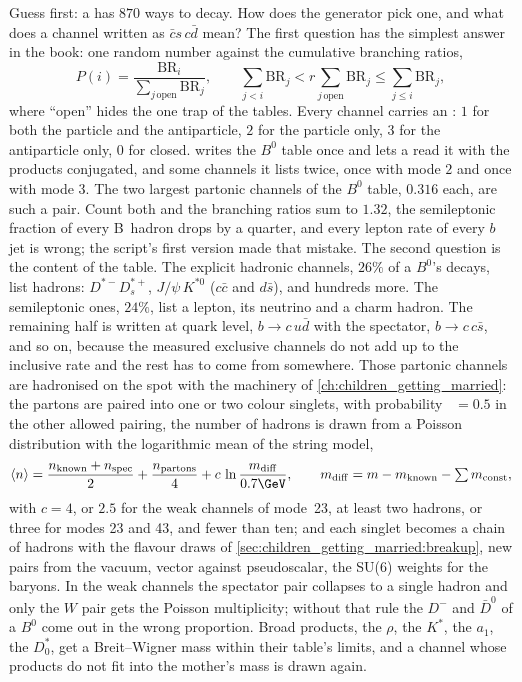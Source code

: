 Guess first: a \Bbar has $870$ ways to decay. How does the generator pick
one, and what does a channel written as $\bar c s\,c\bar d$ mean? The
first question has the simplest answer in the book: one random number
against the cumulative branching ratios,
\begin{equation}
  P(i)=\frac{\mathrm{BR}_i}{\sum_{j\,\mathrm{open}}\mathrm{BR}_j},\qquad
  \sum_{j<i}\mathrm{BR}_j<r\sum_{j\,\mathrm{open}}\mathrm{BR}_j\le\sum_{j\le i}\mathrm{BR}_j,
  \label{eq:children_producing_grandchildren:channel}
\end{equation}
where ``open'' hides the one trap of the tables. Every channel carries an
: $1$ for both the particle and the antiparticle, $2$ for the
particle only, $3$ for the antiparticle only, $0$ for closed. \PYTHIA
writes the $B^0$ table once and lets a \Bbar read it with the products
conjugated, and some channels it lists twice, once with mode $2$ and once
with mode $3$. The two largest partonic channels of the $B^0$ table,
$0.316$ each, are such a pair. Count both and the branching ratios sum to $1.32$, the
semileptonic fraction of every B~hadron drops by a quarter, and every
lepton rate of every $b$ jet is wrong; the script's first version made
that mistake. The second question is the content of the table. The
explicit hadronic channels, $26\%$ of a $B^0$'s decays, list hadrons:
$D^{*-}D_s^{*+}$, $J/\psi\,K^{*0}$ ($c\bar c$ and $d\bar s$), and hundreds
more. The semileptonic ones, $24\%$, list a lepton, its neutrino and a
charm hadron. The remaining half is written at quark level, $b\to c\,u\bar d$
with the spectator, $b\to c\,c\bar s$, and so on, because the measured
exclusive channels do not add up to the inclusive rate and the rest has to
come from somewhere. Those partonic channels are hadronised on the spot
with the machinery of \cref{ch:children_getting_married}: the partons are
paired into one or two colour singlets, with probability
~$=0.5$ in the other allowed pairing, the number of
hadrons is drawn from a Poisson distribution with the logarithmic mean of
the string model,
\begin{equation}
  \langle n\rangle=\frac{n_{\mathrm{known}}+n_{\mathrm{spec}}}{2}+\frac{n_{\mathrm{partons}}}{4}
  +c\,\ln\frac{m_{\mathrm{diff}}}{0.7\GeV},\qquad
  m_{\mathrm{diff}}=m-m_{\mathrm{known}}-\textstyle\sum m_{\mathrm{const}},
  \label{eq:children_producing_grandchildren:poisson}
\end{equation}
with $c=4$, or $2.5$ for the weak channels of mode~23, at least two
hadrons, or three for modes 23 and 43, and fewer than ten; and each
singlet becomes a chain of hadrons with the flavour draws of
\cref{sec:children_getting_married:breakup}, new pairs from the vacuum,
vector against pseudoscalar, the SU(6) weights for the baryons. In the
weak channels the spectator pair collapses to a single hadron and only the
$W$ pair gets the Poisson multiplicity; without that rule the $D^-$ and
$\bar D^0$ of a $B^0$ come out in the wrong proportion. Broad products,
the $\rho$, the $K^*$, the $a_1$, the $D_0^*$, get a Breit--Wigner mass
within their table's limits, and a channel whose products do not fit into
the mother's mass is drawn again.

